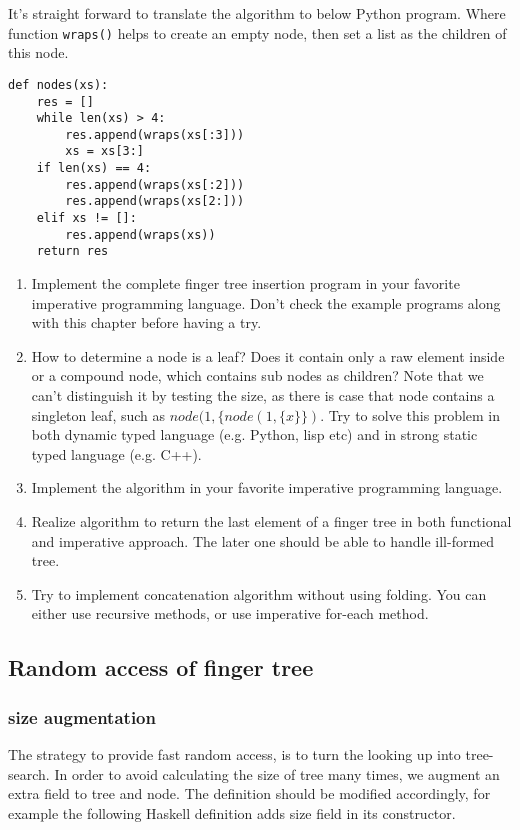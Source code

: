 \documentclass[UTF8]{article}
\begin{document}
It's straight forward to translate the algorithm to below Python program. Where function \verb|wraps()|
helps to create an empty node, then set a list as the children of this node.

\begin{lstlisting}
def nodes(xs):
    res = []
    while len(xs) > 4:
        res.append(wraps(xs[:3]))
        xs = xs[3:]
    if len(xs) == 4:
        res.append(wraps(xs[:2]))
        res.append(wraps(xs[2:]))
    elif xs != []:
        res.append(wraps(xs))
    return res
\end{lstlisting}

\begin{Exercise}
\begin{enumerate}
\item Implement the complete finger tree insertion program in your favorite imperative
programming language. Don't check the example programs along with this chapter before
having a try.

\item How to determine a node is a leaf? Does it contain only a raw element inside or a compound
node, which contains sub nodes as children? Note that we can't distinguish it by testing
the size, as there is case that node contains a singleton leaf, such as $node(1, \{node(1, \{x\}\})$.
Try to solve this problem in both dynamic typed language (e.g. Python, lisp etc) and
in strong static typed language (e.g. C++).

\item Implement the  algorithm in your favorite imperative programming
language.

\item Realize algorithm to return the last element of a finger tree in both functional and
imperative approach. The later one should be able to handle ill-formed tree.

\item Try to implement concatenation algorithm without using folding. You can either use
recursive methods, or use imperative for-each method.
\end{enumerate}
\end{Exercise}

\subsection{Random access of finger tree}

\subsubsection{size augmentation}
The strategy to provide fast random access, is to turn the looking up into tree-search.
In order to avoid calculating the size of tree many times, we augment an extra field
to tree and node. The definition should be modified accordingly, for example the
following Haskell definition adds size field in its constructor.
\end{document}
